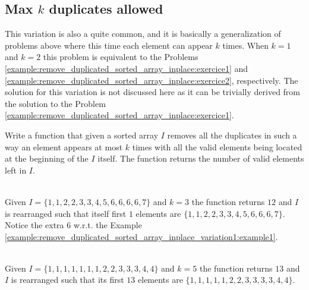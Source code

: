 \subsection{Max $k$ duplicates allowed}
This variation is also a quite common, and it is basically a generalization of problems above where this time each element can appear $k$ times.
When $k= 1$ and $k=2$ this problem is equivalent to the Problems \ref{example:remove_duplicated_sorted_array_inplace:exercice1} and \ref{example:remove_duplicated_sorted_array_inplace:exercice2}, respectively.
The solution for this variation is not discussed here as it can be trivially derived from the solution to the Problem \ref{example:remove_duplicated_sorted_array_inplace:exercice1}.
\begin{exercise}
	Write a function that given a sorted array $I$ removes all the 
	duplicates in such a way an element appears at most $k$ times with all the valid elements being located at the beginning of the $I$ itself.
	The function returns the number of valid elements left in $I$.
	
	\label{example:remove_duplicated_sorted_array_inplace_variation:exercice3}
	
		\begin{example}
			\label{example:remove_duplicated_sorted_array_inplace_variation2:example1}
			\hfill \\
			Given $I=\{1,1,2,2,3,3,4,5,6,6,6,6,7\}$ and $k=3$ the function returns $12$ and $I$ is rearranged such
			that itself first $1$ elements are $\{1,1,2,2,3,3,4,5,6,6,6,7\}$. Notice the extra $6$ w.r.t. the Example \ref{example:remove_duplicated_sorted_array_inplace_variation1:example1}.
		\end{example}
	
		\begin{example}
			\label{example:remove_duplicated_sorted_array_inplace_variation2:example2}
			\hfill \\
			Given $I=\{1,1,1,1,1,1,1,2,2,3,3,3,4,4\}$ and $k=5$ the function returns $13$ and $I$ is rearranged such that its first $13$
			elements are $\{1,1,1,1,1,2,2,3,3,3,3,4,4\}$.	
		\end{example}
	\end{exercise}